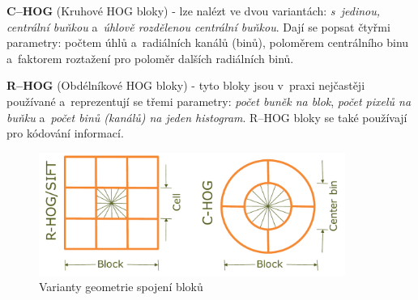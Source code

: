 \textbf{C--HOG} (Kruhové HOG bloky) - lze nalézt ve dvou variantách: \textit{s~jedinou, centrální buňkou} a~\textit{úhlově rozdělenou centrální buňkou}. Dají se popsat čtyřmi parametry: počtem úhlů a~radiálních kanálů (binů), poloměrem centrálního binu a~faktorem roztažení pro poloměr dalších radiálních binů.

\textbf{R--HOG} (Obdélníkové HOG bloky) - tyto bloky jsou v~praxi nejčastěji používané a~reprezentují se třemi parametry: \textit{počet buněk na blok}, \textit{počet pixelů na buňku} a~\textit{počet binů (kanálů) na jeden histogram}. R--HOG bloky se také používají pro kódování informací. 
\begin{figure}[H]
  \centering
  \includegraphics[width=10cm]{assets/9_hog_variants.pdf}
  \caption{Varianty geometrie spojení bloků}
  \label{variants_block}
\end{figure}

